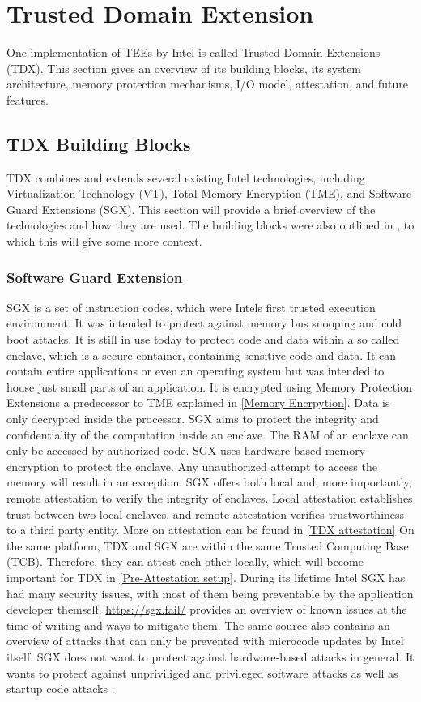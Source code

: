 \section{Trusted Domain Extension}
One implementation of TEEs by Intel is called Trusted Domain Extensions (TDX). This section gives an overview of its building blocks, its system architecture, memory protection mechanisms, I/O model, attestation, and future features.
\subsection{TDX Building Blocks}
\label{sec:tdxBuildingBlocks}
TDX combines and extends several existing Intel technologies, including Virtualization Technology (VT), Total Memory Encryption (TME), and Software Guard Extensions (SGX). This section will provide a brief overview of the technologies and how they are used. The building blocks were also outlined in \cite{cheng_intel_2023}, to which this will give some more context.
\subsubsection{Software Guard Extension}
SGX is a set of instruction codes, which were Intels first trusted execution environment. It was intended to protect against memory bus snooping and cold boot attacks. It is still in use today to protect code and data within a so called enclave, which is a secure container, containing sensitive code and data. It can contain entire applications or even an operating system but was intended to house just small parts of an application. It is encrypted using Memory Protection Extensions a predecessor to TME explained in \cref{Memory Encrpytion}. Data is only decrypted inside the processor\cite{intel_corporation_overview--intel-sgx-enclave_nodate}. SGX aims to protect the integrity and confidentiality of the computation inside an enclave. The RAM of an enclave can only be accessed by authorized code. SGX uses hardware-based memory encryption to protect the enclave. Any unauthorized attempt to access the memory will result in an exception. SGX offers both local and, more importantly, remote attestation to verify the integrity of enclaves. Local attestation establishes trust between two local enclaves, and remote attestation verifies trustworthiness to a third party entity. More on attestation can be found in \cref{TDX attestation} On the same platform, TDX and SGX are within the same Trusted Computing Base (TCB).  Therefore, they can attest each other locally\cite{intel_corporation_intel_2024-1}, which will become important for TDX in \cref{Pre-Attestation setup}. During its lifetime Intel SGX has had many security issues, with most of them being preventable by the application developer themself. \url{https://sgx.fail/}\cite{sgxfail} provides an overview of known issues at the time of writing and ways to mitigate them. The same source also contains an overview of attacks that can only be prevented with microcode updates by Intel itself. SGX does not want to protect against hardware-based attacks in general\cite{costan_intel_2016}. It wants to protect against unpriviliged and privileged software attacks as well as startup code attacks \cite{schutz_general_nodate}.
